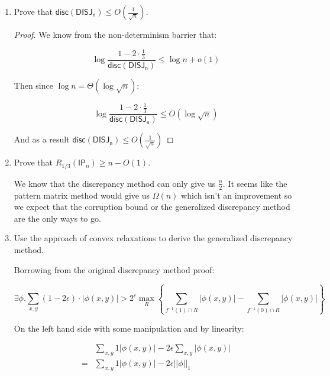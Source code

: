 \documentclass[usletter]{article}
\begin{document}

\begin{enumerate}
  \item Prove that $\mathsf{disc}(\mathsf{DISJ_n}) \leq O(\frac{1}{\sqrt{n}})$.
    \begin{proof}
      We know from the non-determinism barrier that:

      \begin{equation*}
        \log \frac{1 - 2 \cdot \frac{1}{3}}{\mathsf{disc}(\mathsf{DISJ_n})} \leq \log n + o(1)
      \end{equation*}

      Then since $\log n = \Theta(\log \sqrt{n})$:

      \begin{equation*}
        \log \frac{1 - 2 \cdot \frac{1}{3}}{\mathsf{disc}(\mathsf{DISJ_n})} \leq O(\log \sqrt{n})
      \end{equation*}

      And as a result $\mathsf{disc}(\mathsf{DISJ_n}) \leq O(\frac{1}{\sqrt{n}})$
    \end{proof}

  \item Prove that $R_{1/3}(\mathsf{IP}_n) \geq n - O(1)$.

    We know that the discrepancy method can only give us $\frac{n}{2}$. It seems like the pattern matrix method would give us $\Omega(n)$ which isn't an improvement so we expect that the corruption bound or the generalized discrepancy method are the only ways to go.

  \item Use the approach of convex relaxations to derive the generalized discrepancy method.

    Borrowing from the original discrepancy method proof:

    \begin{equation*}
      \exists \phi . \sum_{x,y} (1 - 2\epsilon) \cdot |\phi(x,y)| >
        2^c \max_{R} \left\{ \sum_{f^{-1}(1) \cap R} |\phi(x,y)| - \sum_{f^{-1}(0) \cap R} | \phi(x,y)| \right\}
    \end{equation*}

    On the left hand side with some manipulation and by linearity:

    \begin{align*}
      & \sum_{x,y} 1 |\phi(x,y)| - 2\epsilon \sum_{x,y} |\phi(x,y)| \\
      = & \sum_{x,y} 1 |\phi(x,y)| - 2\epsilon ||\phi||_1
    \end{align*}


\end{enumerate}
\end{document}
